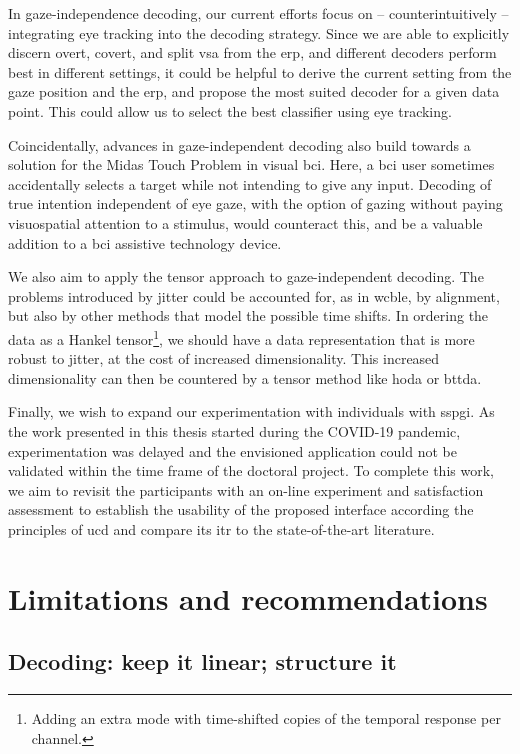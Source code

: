 In gaze-independence decoding, our current efforts focus on --
counterintuitively -- integrating eye tracking into the decoding strategy.
Since we are able to explicitly discern overt, covert, and split \ac{vsa} from
the \ac{erp}, and different decoders perform best in different settings, it
could be helpful to derive the current setting from the gaze position and the
\ac{erp}, and propose the most suited decoder for a given data point.
This could allow us to select the best classifier using eye tracking.

Coincidentally, advances in gaze-independent decoding also build towards a
solution for the Midas Touch Problem in visual \ac{bci}.
Here, a \ac{bci} user sometimes accidentally selects a target while not intending
to give any input.
Decoding of true intention independent of eye
gaze, with the option of gazing without paying visuospatial attention to a
stimulus, would counteract this, and be a valuable addition to a \ac{bci}
assistive technology device.

We also aim to apply the tensor approach to gaze-independent decoding.
The problems introduced by jitter could be accounted for, as in \ac{wcble}, by
alignment, but also by other methods that model the possible time shifts.
In ordering the data as a Hankel tensor\footnote{Adding an extra mode with
time-shifted copies of the temporal response per channel.}, we should have a
data representation that is more robust to jitter, at the cost of increased
dimensionality.
This increased dimensionality can then be countered by a tensor method like
\ac{hoda} or \ac{bttda}.

Finally, we wish to expand our experimentation with individuals with
\ac{sspgi}.
As the work presented in this thesis started during the COVID-19 pandemic,
experimentation was delayed and the envisioned application could not be
validated within the time frame of the doctoral project.
To complete this work, we aim to revisit the participants with an on-line
experiment and satisfaction assessment to establish the usability of the proposed
interface according the principles of \ac{ucd} and
compare its \ac{itr} to the state-of-the-art literature.

\section{Limitations and recommendations}

\subsection{Decoding: keep it linear; structure it}

